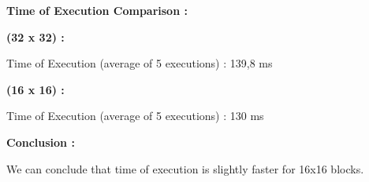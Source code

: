 \documentclass{article}
\begin{document}
\textbf{Time of Execution Comparison :}\newline

\textbf{(32 x 32) :}\newline

Time of Execution (average of 5 executions) : 139,8 ms\newline 

\textbf{(16 x 16) :}\newline

Time of Execution (average of 5 executions) : 130 ms\newline

\textbf{Conclusion :}\newline

We can conclude that time of execution is slightly faster for 16x16 blocks.\newline
\end{document}
